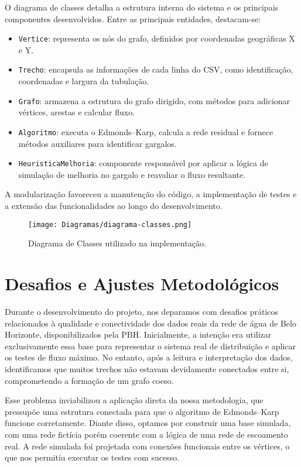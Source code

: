 \documentclass[12pt]{article}
\begin{document}
O diagrama de classes detalha a estrutura interna do sistema e os principais componentes desenvolvidos. Entre as principais entidades, destacam-se:

\begin{itemize}
  \item \texttt{Vertice}: representa os nós do grafo, definidos por coordenadas geográficas X e Y.
  \item \texttt{Trecho}: encapsula as informações de cada linha do CSV, como identificação, coordenadas e largura da tubulação.
  \item \texttt{Grafo}: armazena a estrutura do grafo dirigido, com métodos para adicionar vértices, arestas e calcular fluxo.
  \item \texttt{Algoritmo}: executa o Edmonds–Karp, calcula a rede residual e fornece métodos auxiliares para identificar gargalos.
  \item \texttt{HeuristicaMelhoria}: componente responsável por aplicar a lógica de simulação de melhoria no gargalo e reavaliar o fluxo resultante.
\end{itemize}

A modularização favoreceu a manutenção do código, a implementação de testes e a extensão das funcionalidades ao longo do desenvolvimento.

\begin{figure}[H]
\centering
\texttt{[image: Diagramas/diagrama-classes.png]}
\caption{Diagrama de Classes utilizado na implementação.}
\label{fig:classes}
\end{figure}

\section{Desafios e Ajustes Metodológicos}

Durante o desenvolvimento do projeto, nos deparamos com desafios práticos relacionados à qualidade e conectividade dos dados reais da rede de água de Belo Horizonte, disponibilizados pela PBH. Inicialmente, a intenção era utilizar exclusivamente essa base para representar o sistema real de distribuição e aplicar os testes de fluxo máximo. No entanto, após a leitura e interpretação dos dados, identificamos que muitos trechos não estavam devidamente conectados entre si, comprometendo a formação de um grafo coeso.

Esse problema inviabilizou a aplicação direta da nossa metodologia, que pressupõe uma estrutura conectada para que o algoritmo de Edmonds–Karp funcione corretamente. Diante disso, optamos por construir uma base simulada, com uma rede fictícia porém coerente com a lógica de uma rede de escoamento real. A rede simulada foi projetada com conexões funcionais entre os vértices, o que nos permitiu executar os testes com sucesso.
\end{document}
